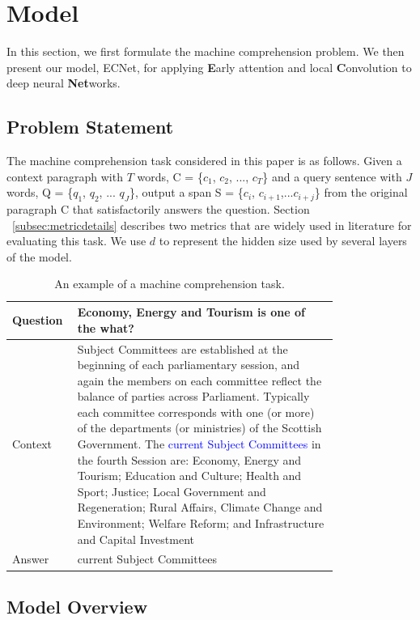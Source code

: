 \section{Model}
\label{sec:model}

In this section, we first formulate the machine comprehension problem. We then present our model, ECNet, for applying \textbf{E}arly attention and local \textbf{C}onvolution to deep neural \textbf{Net}works.

\subsection{Problem Statement}
\label{subsec:problemstatement}

The machine comprehension task considered in this paper is as follows. Given a context paragraph with $T$ words, C = \{$c_1$, $c_2$, ..., $c_T$\} and a query sentence with $J$ words, Q = \{$q_1$, $q_2$, ... $q_J$\}, output a span S = \{$c_i$, $c_{i+1}$,...${c_{i+j}}$\} from the original paragraph C that satisfactorily answers the question. Section ~\ref{subsec:metricdetails} describes two metrics that are widely used in literature for evaluating this task. We use $d$ to represent the hidden size used by several layers of the model.

\begin{table}[htbp]
    \caption{An example of a machine comprehension task.}
    \label{table:economicSchools} 
    \centering
    \begin{tabular}{|l|p{0.8\linewidth}|}
    \hline
    Question   &  Economy, Energy and Tourism is one of the what? \tabularnewline \hline
    Context  & Subject Committees are established at the beginning of each parliamentary session, and again the members on each committee reflect the balance of parties across Parliament. Typically each committee corresponds with one (or more) of the departments (or ministries) of the Scottish Government. The \textcolor{blue}{current Subject Committees} in the fourth Session are: Economy, Energy and Tourism; Education and Culture; Health and Sport; Justice; Local Government and Regeneration; Rural Affairs, Climate Change and Environment; Welfare Reform; and Infrastructure and Capital Investment \tabularnewline \hline
    Answer   & current Subject Committees \tabularnewline \hline
    \end{tabular}
 
\end{table}

\subsection{Model Overview}
\label{subsec:models}

